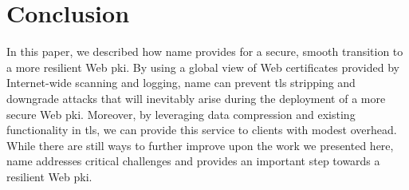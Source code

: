 \section{Conclusion}
\label{sec:conclusion}

In this paper, we described how \ac{name} provides for a secure, smooth
transition to a more resilient Web \ac{pki}. By using a global view of Web
certificates provided by Internet-wide scanning and logging, \ac{name} can
prevent \ac{tls} stripping and downgrade attacks that will inevitably arise
during the deployment of a more secure Web \ac{pki}. Moreover, by leveraging
data compression and existing functionality in \ac{tls}, we can provide this
service to clients with modest overhead. While there are still ways to further
improve upon the work we presented here, \ac{name} addresses critical
challenges and provides an important step towards a resilient Web \ac{pki}. 
